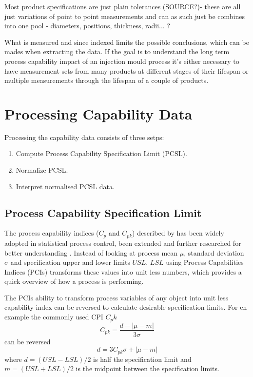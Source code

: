 \documentclass[aip,amsmath, reprint, author-year]{revtex4-1}
\begin{document}
Most product specifications are just plain tolerances (SOURCE?)- these are all just variations of point to point measurements and can as such just be combines into one pool - diameters, positions, thickness, radii... ?

What is measured and since indexed limits the possible conclusions, which can be mades when extracting the data. If the goal is to understand the long term process capability impact of an injection mould process it's either necessary to have measurement sets from many products at different stages of their lifespan or multiple measurements through  the lifespan of a couple of products.    


\section{Processing Capability Data}

Processing the capability data consists of three setps: 

\begin{enumerate}
	\item Compute Process Capability Specification Limit (PCSL).
	\item Normalize PCSL.
	\item Interpret normalised PCSL data.
\end{enumerate}

\subsection{Process Capability Specification Limit}
The process capability indices ($C_p$ and $C_{pk}$) described by \cite{kane1986process} has been widely adopted in statistical process control, been extended and further researched for better understanding \citep{wu2009overview}. 
Instead of looking at process mean $\mu$, standard deviation $\sigma$ and specification upper and lower limits $USL$, $LSL$ using Process Capabilities Indices (PCIs) transforms these values into unit less numbers, which provides a quick overview of how a process is performing.

The PCIs ability to transform process variables of any object into unit less capability index can be reversed to calculate desirable specification limits. For en example the commonly used CPI $C_pk$ 
\begin{equation}
	C_{pk} = \frac{d - | \mu - m|}{3 \sigma}
\end{equation}
can be reversed
\begin{equation}
	d = 3 C_{pk} \sigma + | \mu - m|
\end{equation}
where $d = (USL - LSL) / 2$ is half the specification limit and $m = (USL + LSL) / 2$ is the midpoint between the specification limits. 
\end{document}
